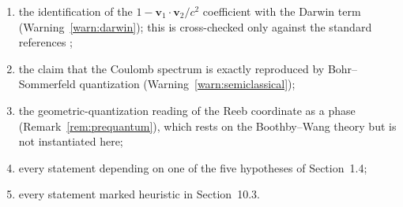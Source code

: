 \begin{enumerate}[label=(\roman*)]
  \item the identification of the $1-\mathbf v_1\!\cdot\!\mathbf v_2/c^{2}$
  coefficient with the Darwin term (Warning~\ref{warn:darwin}); this is
  cross-checked only against the standard references \cite{Darwin1920,Jackson1999};
  \item the claim that the Coulomb spectrum is exactly reproduced by
  Bohr--Sommerfeld quantization (Warning~\ref{warn:semiclassical});
  \item the geometric-quantization reading of the Reeb coordinate as a phase
  (Remark~\ref{rem:prequantum}), which rests on the Boothby--Wang theory
  \cite{BoothbyWang1958,Geiges2008} but is not instantiated here;
  \item every statement depending on one of the five hypotheses of
  Section~1.4;
  \item every statement marked heuristic in Section~10.3.
\end{enumerate}
